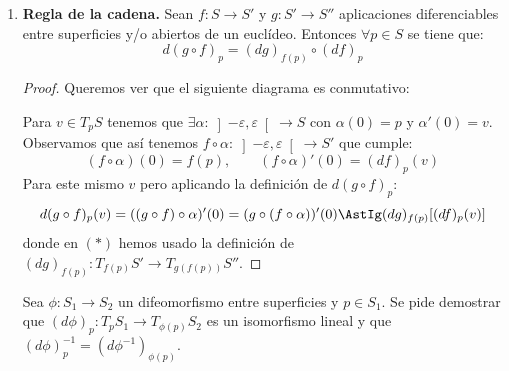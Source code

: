 \begin{enumerate}
    \item \textbf{Regla de la cadena.} Sean $f:S\to S'$ y $g:S'\to S''$ aplicaciones diferenciables entre superficies y/o abiertos de un euclídeo. Entonces $\forall p\in S$ se tiene que:
        \begin{equation*}
            d(g\circ f)_p = (dg)_{f(p)}\circ (d f)_p
        \end{equation*}
        \begin{proof}
            Queremos ver que el siguiente diagrama es conmutativo:
            \begin{figure}[H]
                \centering
            \end{figure}
            \noindent
            Para $v\in T_pS$ tenemos que $\exists \alpha:\left]-\varepsilon,\varepsilon\right[\to S$ con $\alpha(0) = p$ y $\alpha'(0) = v$. Observamos que así tenemos $f\circ\alpha:\left]-\varepsilon,\varepsilon\right[\to S'$ que cumple:
            \begin{equation*}
                (f\circ \alpha)(0) = f(p), \qquad (f\circ \alpha)'(0) = (d f)_p(v)
            \end{equation*}
            Para este mismo $v$ pero aplicando la definición de $d(g\circ f)_p$:
            \begin{equation*}
                d(g\circ f)_p(v) = ((g\circ f)\circ \alpha)'(0) = (g\circ (f\circ \alpha))'(0) \AstIg (d g)_{f(p)}[(d f)_p(v)] 
            \end{equation*}
            donde en $(\ast)$ hemos usado la definición de $(dg)_{f(p)}:T_{f(p)}S'\to T_{g(f(p))}S''$.
        \end{proof}

    \begin{ejercicio}
        Sea $\phi:S_1\to S_2$ un difeomorfismo entre superficies y $p\in S_1$. Se pide demostrar que $(d\phi)_p:T_pS_1\to T_{\phi(p)}S_2$ es un isomorfismo lineal y que ${(d\phi)}^{-1}_p = (d\phi^{-1})_{\phi(p)}$.\\


\end{ejercicio}
\end{enumerate}
